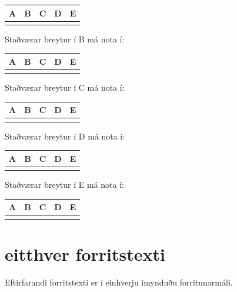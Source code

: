 \documentclass{article}
\newcommand{\bo}[1]{\textbf{#1}}
\begin{document}
\begin{tabularx}{\textwidth}{|X|X|X|X|X|}
    \hline
    \bo{A} & \bo{B} & \bo{C} & \bo{D} & \bo{E}\\ \hline
    & & & & \\ \hline
\end{tabularx}

\vspace{1cm}

Staðværar breytur í B má nota í:


\begin{tabularx}{\textwidth}{|X|X|X|X|X|}
    \hline
    \bo{A} & \bo{B} & \bo{C} & \bo{D} & \bo{E}\\ \hline
    & & & & \\ \hline
\end{tabularx}

\vspace{1cm}

Staðværar breytur í C má nota í:


\begin{tabularx}{\textwidth}{|X|X|X|X|X|}
    \hline
    \bo{A} & \bo{B} & \bo{C} & \bo{D} & \bo{E}\\ \hline
    & & & & \\ \hline
\end{tabularx}

\vspace{1cm}

Staðværar breytur í D má nota í:


\begin{tabularx}{\textwidth}{|X|X|X|X|X|}
    \hline
    \bo{A} & \bo{B} & \bo{C} & \bo{D} & \bo{E}\\ \hline
    & & & & \\ \hline
\end{tabularx}

\vspace{1cm}

Staðværar breytur í E má nota í:


\begin{tabularx}{\textwidth}{|X|X|X|X|X|}
    \hline
    \bo{A} & \bo{B} & \bo{C} & \bo{D} & \bo{E}\\ \hline
    & & & & \\ \hline
\end{tabularx}


\newpage
\section{eitthver forritstexti}
Eftirfarandi forritstexti er í einhverju ímynduðu forritunarmáli.
\end{document}
